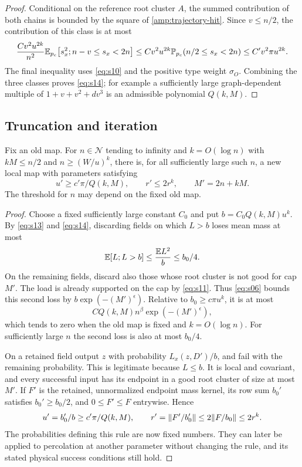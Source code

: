 \begin{proof}
Conditional on the reference root cluster $A$, the summed contribution
of both chains is bounded by the square of \eqref{amp:trajectory-hit}.
Since $v\le n/2$, the contribution of this class is at most
\[
 \frac{C v^2u^{2k}}{n^2}
 \mathbb E_{{p_c}}\bigl[s_x^2; n-v\le s_x<2n\bigr]
 \le C v^2u^{2k}\mathbb P_{{p_c}}(n/2\le s_x<2n)
 \le C'v^2\pi u^{2k}.
\]
The final inequality uses \eqref{eq:s10} and the positive type weight
$\sigma_O$.  Combining the three classes proves \eqref{eq:s14}; for
example a sufficiently large graph-dependent multiple of
$1+v+v^2+dv^3$ is an admissible polynomial $Q(k,M)$.
\end{proof}

\subsection{Truncation and iteration}\label{amp:iteration-section}

\begin{lemma}\label{amp:step}
Fix an old map.  For $n\in\mathcal N$ tending to infinity and
$k=O(\log n)$ with $kM\le n/2$ and $n\ge(W/u)^k$, there is, for all
sufficiently large such $n$, a new local map with parameters satisfying
\begin{equation}\label{eq:s15}
 u'\ge c'\pi/Q(k,M),\qquad r'\le2r^k,
 \qquad M'=2n+kM.
\end{equation}
The threshold for $n$ may depend on the fixed old map.
\end{lemma}

\begin{proof}
Choose a fixed sufficiently large constant $C_0$ and put
$b=C_0Q(k,M)u^k$.  By \eqref{eq:s13} and \eqref{eq:s14}, discarding
fields on which $L>b$ loses mean mass at most
\[
 \mathbb E[L;L>b]\le\frac{\mathbb E L^2}{b}\le b_0/4.
\]
On the remaining fields, discard also those whose root cluster is not
good for cap $M'$.  The load is already supported on the cap by
\eqref{eq:s11}.  Thus \eqref{eq:s06} bounds this second loss by
$b\exp(-(M')^\epsilon)$.  Relative to $b_0\ge c\pi u^k$, it is at most
\[
 C Q(k,M)n^\beta\exp(-(M')^\epsilon),
\]
which tends to zero when the old map is fixed and $k=O(\log n)$.
For sufficiently large $n$ the second loss is also at most $b_0/4$.

On a retained field output $z$ with probability $L_x(z,D')/b$, and
fail with the remaining probability.  This is legitimate because
$L\le b$.  It is local and covariant, and every successful input has
its endpoint in a good root cluster of size at most $M'$.  If $F'$ is
the retained, unnormalized endpoint mass kernel, its row sum $b_0'$
satisfies $b_0'\ge b_0/2$, and $0\le F'\le F$ entrywise.  Hence
\[
 u'=b_0'/b\ge c'\pi/Q(k,M),\qquad
 r'=\lVert F'/b_0'\rVert\le2\lVert F/b_0\rVert\le2r^k.
\]
The probabilities defining this rule are now fixed numbers.  They can
later be applied to percolation at another parameter without changing
the rule, and its stated physical success conditions still hold.
\end{proof}

